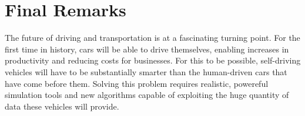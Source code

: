 \documentclass[ %
                    author={Alexander Hill},
                supervisor={Dr. Benjamin Sach},
                    degree={MEng},
                     title={MARMOSET},
                  subtitle={Multi-Agent Route Management using Online Simulation for Efficient Transportation},
                      type={research},
                      year={2016} ]{dissertation}
\begin{document}
\section{Final Remarks}

The future of driving and transportation is at a fascinating turning point. For
the first time in history, cars will be able to drive themselves, enabling
increases in productivity and reducing costs for businesses. For this to be
possible, self-driving vehicles will have to be substantially smarter than the
human-driven cars that have come before them. Solving this problem requires
realistic, powereful simulation tools and new algorithms capable of exploiting the
huge quantity of data these vehicles will provide.


%
%

\backmatter










\end{document}
